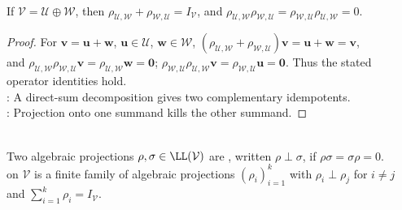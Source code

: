\begin{proposition} \label{prop:complementary-algebraic-projections} \\
If $\mathcal{V}=\mathcal{U}\oplus\mathcal{W}$, then $\rho_{\mathcal{U},\mathcal{W}}+\rho_{\mathcal{W},\mathcal{U}}=I_{\mathcal{V}}$, and $\rho_{\mathcal{U},\mathcal{W}}\rho_{\mathcal{W},\mathcal{U}} =\rho_{\mathcal{W},\mathcal{U}}\rho_{\mathcal{U},\mathcal{W}}=0$.
\begin{proof}
For $\mathbf{v}=\mathbf{u}+\mathbf{w}$, $\mathbf{u}\in\mathcal{U}$, $\mathbf{w}\in\mathcal{W}$, $(\rho_{\mathcal{U},\mathcal{W}}+\rho_{\mathcal{W},\mathcal{U}})\mathbf{v} =\mathbf{u}+\mathbf{w} =\mathbf{v}$,\\
and $\rho_{\mathcal{U},\mathcal{W}}\rho_{\mathcal{W},\mathcal{U}}\mathbf{v} =\rho_{\mathcal{U},\mathcal{W}}\mathbf{w} =\mathbf{0}$; $\rho_{\mathcal{W},\mathcal{U}}\rho_{\mathcal{U},\mathcal{W}}\mathbf{v} =\rho_{\mathcal{W},\mathcal{U}}\mathbf{u} =\mathbf{0}$. Thus the stated operator identities hold.\\
: A direct-sum decomposition gives two complementary idempotents.\\
: Projection onto one summand kills the other summand.
\end{proof}
\end{proposition}

\begin{definition} \label{def:algebraically-orthogonal-projections-and-resolutions} \\
Two algebraic projections $\rho,\sigma\in\LL(\mathcal{V})$ are , written $\rho\perp\sigma$, if $\rho\sigma=\sigma\rho=0$.\\
 on $\mathcal{V}$ is a finite family of algebraic projections $(\rho_i)_{i=1}^{k}$ with $\rho_i\perp\rho_j$ for $i\neq j$ and $\sum\limits_{i=1}^{k}\rho_i=I_{\mathcal{V}}$.
\end{definition}

